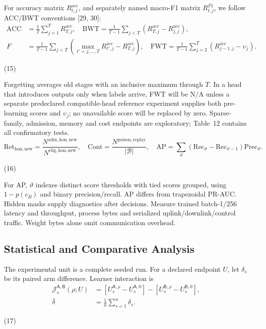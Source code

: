 \documentclass[10pt,a4paper]{article}
\newcommand{\NA}{\mathrm{N/A}}
\begin{document}
For accuracy matrix $R^{\mathrm{acc}}_{t,j}$, and separately named macro-F1 matrix $R^{F1}_{t,j}$, we follow ACC/BWT conventions [29, 30]:
\begin{equation}
\begin{aligned}
\mathrm{ACC}&=\frac1T\sum_{j=1}^TR^{\mathrm{acc}}_{T,j},\quad
\mathrm{BWT}=\frac1{T-1}\sum_{j<T}(R^{\mathrm{acc}}_{T,j}-R^{\mathrm{acc}}_{j,j}),\\
F&=\frac1{T-1}\sum_{j<T}\left(\max_{t'=j,\ldots,T}R^{\mathrm{acc}}_{t',j}-R^{\mathrm{acc}}_{T,j}\right),\quad
\mathrm{FWT}=\frac1{T-1}\sum_{j=2}^T(R^{\mathrm{acc}}_{j-1,j}-\upsilon_j).
\end{aligned}

\end{equation}
\par\hfill(15)\par

Forgetting averages old stages with an inclusive maximum through $T$. In a head that introduces outputs only when labels arrive, FWT will be $\NA$ unless a separate predeclared compatible-head reference experiment supplies both pre-learning scores and $\upsilon_j$; no unavailable score will be replaced by zero. Sparse-family, admission, memory and cost endpoints are exploratory; Table~12 contains all confirmatory tests.
\begin{equation}
\mathrm{Ret}_{\mathrm{hon,new}}=\frac{N^{\mathrm{adm,hon,new}}}{N^{\mathrm{elig,hon,new}}},\quad
\mathrm{Cont}=\frac{N^{\mathrm{poison,replay}}}{|\mathcal B|},\quad
\mathrm{AP}=\sum_\vartheta(\mathrm{Rec}_\vartheta-\mathrm{Rec}_{\vartheta-1})\mathrm{Prec}_\vartheta.

\end{equation}
\par\hfill(16)\par

For AP, $\vartheta$ indexes distinct score thresholds with tied scores grouped, using $1-p(c_B)$ and binary precision/recall. AP differs from trapezoidal PR-AUC. Hidden masks supply diagnostics after decisions. Measure trained batch-1/256 latency and throughput, process bytes and serialized uplink/downlink/control traffic. Weight bytes alone omit communication overhead.

\subsection{Statistical and Comparative Analysis}
The experimental unit is a complete seeded run. For a declared endpoint $U$, let $\delta_s$ be its paired arm difference. Learner interaction is
\begin{equation}
\begin{aligned}
\mathcal J_s^{\mathsf A,\mathsf B}(\rho;U)&=[U_s^{\mathsf A,\rho}-U_s^{\mathsf A,0}]-[U_s^{\mathsf B,\rho}-U_s^{\mathsf B,0}],\\
\bar\delta&=\frac1n\sum_{s=1}^n\delta_s.
\end{aligned}

\end{equation}
\par\hfill(17)\par
\end{document}
